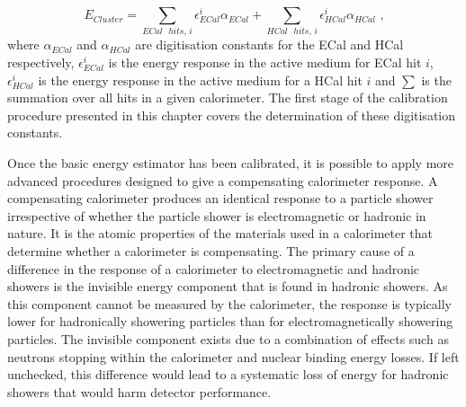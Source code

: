 %
\begin{equation}
E_{Cluster} = \sum_{ECal \text{ } hits \text{, }i} \epsilon^{i}_{ECal} \alpha_{ECal} + \sum_{HCal \text{ } hits \text{, }i} \epsilon^{i}_{HCal} \alpha_{HCal} \text{ ,}
\end{equation}
%
\noindent where $\alpha_{ECal}$ and $\alpha_{HCal}$ are digitisation constants for the ECal and HCal respectively, $\epsilon^{i}_{ECal}$ is the energy response in the active medium for ECal hit $i$, $\epsilon^{i}_{HCal}$ is the energy response in the active medium for a HCal hit $i$ and $\sum$ is the summation over all hits in a given calorimeter.  The first stage of the calibration procedure presented in this chapter covers the determination of these digitisation constants.  

Once the basic energy estimator has been calibrated, it is possible to apply more advanced procedures designed to give a compensating calorimeter response.  A compensating calorimeter produces an identical response to a particle shower irrespective of whether the particle shower is electromagnetic or hadronic in nature.  It is the atomic properties of the materials used in a calorimeter that determine whether a calorimeter is compensating.  The primary cause of a difference in the response of a calorimeter to electromagnetic and hadronic showers is the invisible energy component that is found in hadronic showers.  As this component cannot be measured by the calorimeter, the response is typically lower for hadronically showering particles than for electromagnetically showering particles.  The invisible component exists due to a combination of effects such as neutrons stopping within the calorimeter and nuclear binding energy losses.  If left unchecked, this difference would lead to a systematic loss of energy for hadronic showers that would harm detector performance.  


